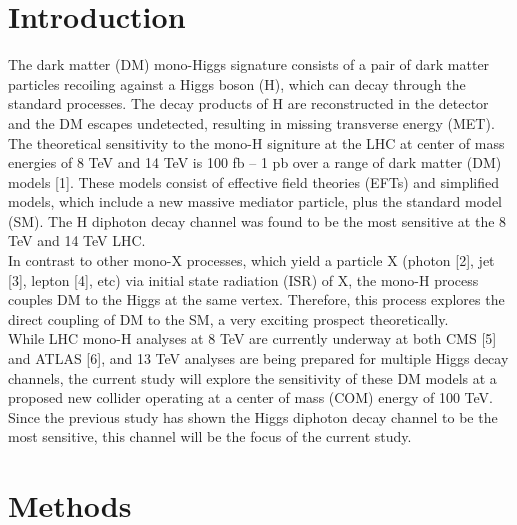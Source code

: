 \documentclass[twoside]{article}
\begin{document}
\begin{multicols}{2} %

\section{Introduction}

\noindent The dark matter (DM) mono-Higgs signature consists of a pair of dark matter particles recoiling against a Higgs boson (H), which can decay through the standard processes. The decay products of H are reconstructed in the detector and the DM escapes undetected, resulting in missing transverse energy (MET).\\
\indent The theoretical sensitivity to the mono-H signiture at the LHC at center of mass energies of 8 TeV and 14 TeV is 100 fb -- 1 pb over a range of dark matter (DM) models [1]. These models consist of effective field theories (EFTs) and simplified models, which include a new massive mediator particle, plus the standard model (SM). The H diphoton decay channel was found to be the most sensitive at the 8 TeV and 14 TeV LHC.\\
\indent In contrast to other mono-X processes, which yield a particle X (photon [2], jet [3], lepton [4], etc) via initial state radiation (ISR) of X, the mono-H process couples DM to the Higgs at the same vertex. Therefore, this process explores the direct coupling of DM to the SM, a very exciting prospect theoretically. \\
\indent While LHC mono-H analyses at 8 TeV are currently underway at both CMS [5] and ATLAS [6], and 13 TeV analyses are being prepared for multiple Higgs decay channels, the current study will explore the sensitivity of these DM models at a proposed new collider operating at a center of mass (COM) energy of 100 TeV. Since the previous study has shown the Higgs diphoton decay channel to be the most sensitive, this channel will be the focus of the current study. \\

\section{Methods}


\end{multicols}
\end{document}
